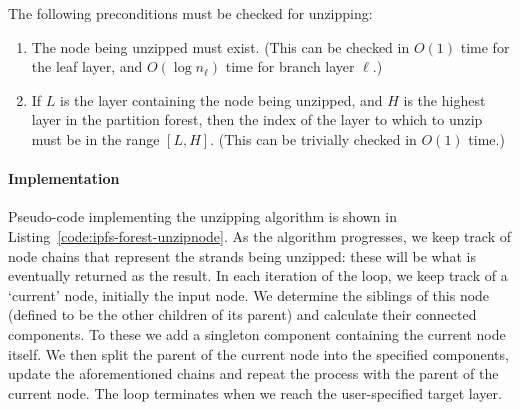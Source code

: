The following preconditions must be checked for unzipping:

\begin{enumerate}

\item The node being unzipped must exist. (This can be checked in $O(1)$ time for the leaf layer, and $O(\log n_\ell)$ time for branch layer $\ell$.)
\item If $L$ is the layer containing the node being unzipped, and $H$ is the highest layer in the partition forest, then the index of the layer to which to unzip must be in the range $[L,H]$. (This can be trivially checked in $O(1)$ time.)

\end{enumerate}

\paragraph{Implementation}

Pseudo-code implementing the unzipping algorithm is shown in Listing~\ref{code:ipfs-forest-unzipnode}. As the algorithm progresses, we keep track of node chains that represent the strands being unzipped: these will be what is eventually returned as the result. In each iteration of the loop, we keep track of a `current' node, initially the input node. We determine the siblings of this node (defined to be the other children of its parent) and calculate their connected components. To these we add a singleton component containing the current node itself. We then split the parent of the current node into the specified components, update the aforementioned chains and repeat the process with the parent of the current node. The loop terminates when we reach the user-specified target layer.

